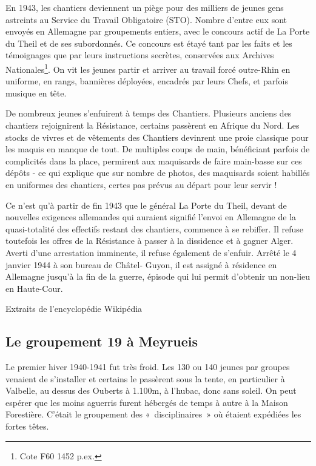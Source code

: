 En 1943, les chantiers deviennent un piège pour des milliers de jeunes gens astreints au Service du Travail
Obligatoire (STO). Nombre d'entre eux sont envoyés en Allemagne par groupements entiers, avec le concours
actif de La Porte du Theil et de ses subordonnés. Ce concours est étayé tant par les faits et les témoignages
que par leurs instructions secrètes, conservées aux Archives Nationales\footnote{Cote F60 1452 p.ex.}. On vit les
jeunes partir et arriver au travail forcé outre-Rhin en uniforme, en rangs, bannières déployées, encadrés par
leurs Chefs, et parfois musique en tête.

De nombreux jeunes s'enfuirent à temps des Chantiers. Plusieurs anciens des chantiers rejoignirent la
Résistance, certains passèrent en Afrique du Nord. Les stocks de vivres et de vêtements des Chantiers
devinrent une proie classique pour les maquis en manque de tout. De multiples coups de main, bénéficiant
parfois de complicités dans la place, permirent aux maquisards de faire main-basse sur ces dépôts - ce qui
explique que sur nombre de photos, des maquisards soient habillés en uniformes des chantiers, certes pas
prévus au départ pour leur servir !

Ce n'est qu'à partir de fin 1943 que le général La Porte du Theil, devant de nouvelles exigences allemandes
qui auraient signifié l'envoi en Allemagne de la quasi-totalité des effectifs restant des chantiers, commence
à se rebiffer. Il refuse toutefois les offres de la Résistance à passer à la dissidence et à gagner Alger. Averti
d'une arrestation imminente, il refuse également de s'enfuir. Arrêté le 4 janvier 1944 à son bureau de Châtel-
Guyon, il est assigné à résidence en Allemagne jusqu'à la fin de la guerre, épisode qui lui permit d'obtenir un
non-lieu en Haute-Cour.

\begin{flushright}
Extraits de l'encyclopédie Wikipédia
\end{flushright}


\subsection{Le groupement 19 à Meyrueis}

Le premier hiver 1940-1941 fut très froid. Les 130 ou 140 jeunes par groupes
venaient de s’installer et certains le passèrent sous la tente, en particulier à Valbelle,
au dessus des Ouberts à 1.100m, à l’hubac, donc sans soleil. On peut espérer que les
moins aguerris furent hébergés de temps à autre à la Maison Forestière. C’était le
groupement des «~disciplinaires~» où étaient expédiées les fortes têtes.

